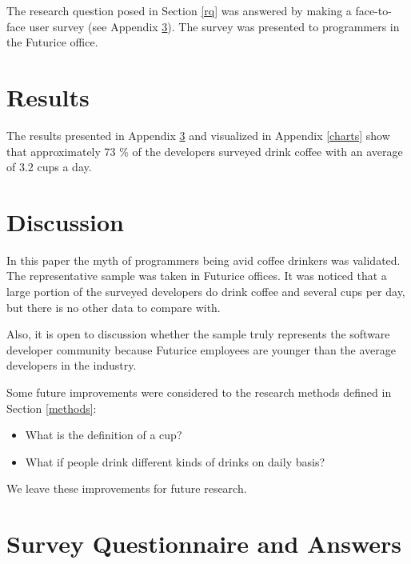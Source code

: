 \documentclass[a4paper,12pt]{article}
\begin{document}
The research question posed in Section \ref{rq} was answered by making
a face-to-face user survey (see Appendix \ref{survey}). The survey was
presented to programmers in the Futurice office.

\section{Results}

The results presented in Appendix \ref{survey} and visualized in
Appendix \ref{charts} show that approximately 73 \% of the developers
surveyed drink coffee with an average of 3.2 cups a day.

\section{Discussion}


In this paper the myth of programmers being avid coffee drinkers was
validated. The representative sample was taken in Futurice offices. It
was noticed that a large portion of the surveyed developers do drink
coffee and several cups per day, but there is no other data to compare
with.

Also, it is open to discussion whether the sample truly represents the
software developer community because Futurice employees are younger
than the average developers in the industry.

Some future improvements were considered to the research methods
defined in Section \ref{methods}:

\begin{itemize}
\item What is the definition of a cup?
\item What if people drink different kinds of drinks on daily basis?
\end{itemize}

\noindent We leave these improvements for future research.

\clearpage
\appendix
\section{Survey Questionnaire and Answers}
\label{survey}
\end{document}
